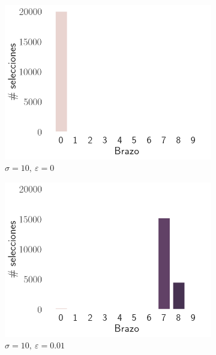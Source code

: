 \documentclass[12pt]{article}
\begin{document}
\begin{figure}[H]
        \begin{subfigure}[H]{0.3\textwidth}
            \includegraphics[width=\textwidth]{../img/arm_sigma_10_epsilon_0}
            \caption{$\sigma=10 ,\ \varepsilon=0$}
            \label{fig:arms_selected_10_0}
        \end{subfigure}
        \begin{subfigure}[H]{0.3\textwidth}
            \includegraphics[width=\textwidth]{../img/arm_sigma_10_epsilon_0.01}
            \caption{$\sigma=10 ,\ \varepsilon=0.01$}
            \label{fig:arms_selected_10_0.01}
        \end{subfigure}
        \begin{subfigure}[H]{0.3\textwidth}

\end{subfigure}
\end{figure}
\end{document}
